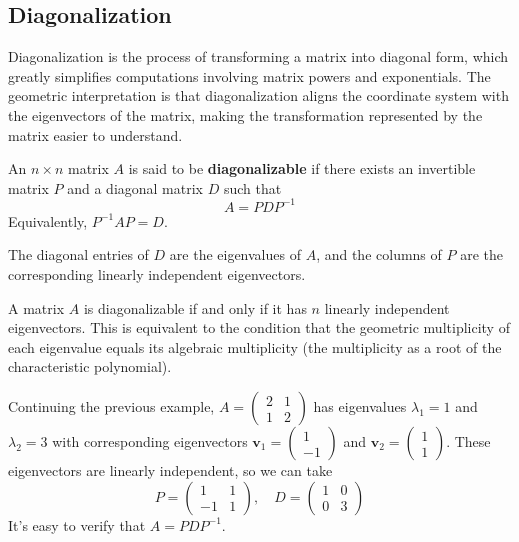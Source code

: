 \documentclass[oneside]{book}
\begin{document}
\subsection{Diagonalization}

Diagonalization is the process of transforming a matrix into diagonal form, which greatly simplifies computations involving matrix powers and exponentials. The geometric interpretation is that diagonalization aligns the coordinate system with the eigenvectors of the matrix, making the transformation represented by the matrix easier to understand.

\begin{definition}
An $n \times n$ matrix $A$ is said to be \textbf{diagonalizable} if there exists an invertible matrix $P$ and a diagonal matrix $D$ such that
\[
A = PDP^{-1}
\]
Equivalently, $P^{-1}AP = D$.
\end{definition}

The diagonal entries of $D$ are the eigenvalues of $A$, and the columns of $P$ are the corresponding linearly independent eigenvectors.

\begin{theorem}
A matrix $A$ is diagonalizable if and only if it has $n$ linearly independent eigenvectors. This is equivalent to the condition that the geometric multiplicity of each eigenvalue equals its algebraic multiplicity (the multiplicity as a root of the characteristic polynomial).
\end{theorem}

\begin{example}
Continuing the previous example, $A = \begin{pmatrix} 2 & 1 \\ 1 & 2 \end{pmatrix}$ has eigenvalues $\lambda_1=1$ and $\lambda_2=3$ with corresponding eigenvectors $\mathbf{v}_1 = \begin{pmatrix} 1 \\ -1 \end{pmatrix}$ and $\mathbf{v}_2 = \begin{pmatrix} 1 \\ 1 \end{pmatrix}$. These eigenvectors are linearly independent, so we can take
\[
P = \begin{pmatrix} 1 & 1 \\ -1 & 1 \end{pmatrix}, \quad D = \begin{pmatrix} 1 & 0 \\ 0 & 3 \end{pmatrix}
\]
It's easy to verify that $A = PDP^{-1}$.
\end{example}
\end{document}
